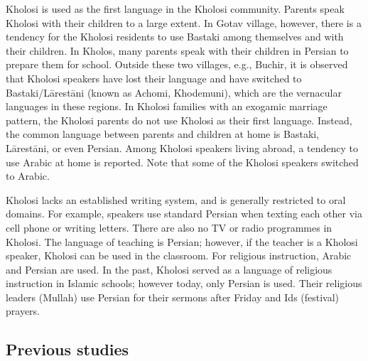 \documentclass[output=paper,colorlinks,citecolor=brown]{langscibook}
\begin{document}
Kholosi is used as the first language in the Kholosi community. Parents speak Kholosi with their children to a large extent. In Gotav village, however, there is a tendency for the Kholosi residents to use Bastaki among themselves and with their children. In Kholos, many parents speak with their children in Persian to prepare them for school. Outside these two villages, e.g., Buchir, it is observed that Kholosi speakers have lost their language and have switched to Bastaki/Lārestāni (known as Achomi, Khodemuni), which are the vernacular languages in these regions. In Kholosi families with an exogamic marriage pattern, the Kholosi parents do not use Kholosi as their first language. Instead, the common language between parents and children at home is Bastaki, Lārestāni, or even Persian. Among Kholosi speakers living abroad, a tendency to use Arabic at home is reported. Note that some of the Kholosi speakers switched to Arabic.

Kholosi lacks  an established writing system, and is generally restricted to oral domains. For example, speakers use standard Persian when texting each other via cell phone or writing letters. There are also no TV or radio programmes in Kholosi. The language of teaching is Persian; however, if the teacher is a Kholosi speaker, Kholosi can be used in the classroom. For religious instruction, Arabic and Persian are used. In the past, Kholosi served as a language of religious instruction in Islamic schools; however today, only Persian is used. Their religious leaders (Mullah) use Persian for their sermons after Friday and Ids (festival) prayers.

\subsection{Previous studies}\label{Kholosi:ss:1.1}
\end{document}

